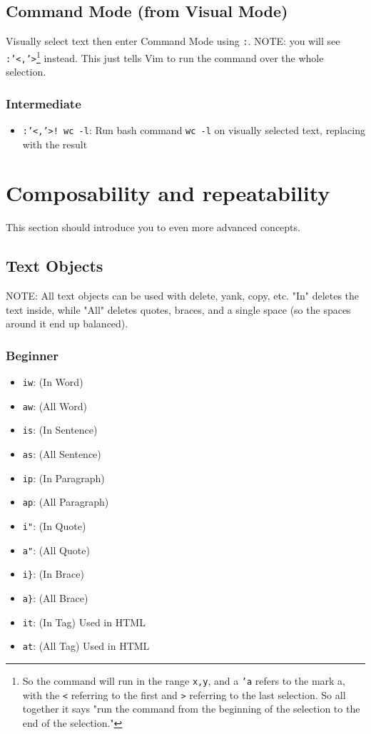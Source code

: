 \documentclass[11pt]{article}
\begin{document}
\subsection{Command Mode (from Visual Mode)}
\label{sec:orgb7e04bd}
Visually select text then enter Command Mode using \texttt{:}. NOTE: you will see
\texttt{:'<,'>}\footnote{So the command will run in the range \texttt{x,y}, and a \texttt{'a} refers to
the mark a, with the \texttt{<} referring to the first and \texttt{>} referring to the
last selection. So all together it says "run the command from the 
beginning of the selection to the end of the selection."} instead. This just tells Vim to run the command over the whole
selection.
\subsubsection{Intermediate}
\label{sec:orge2b03f9}
\begin{itemize}
\item \texttt{:'<,'>! wc -l}: Run bash command \texttt{wc -l} on visually selected text, replacing with the result
\end{itemize}
\section{Composability and repeatability}
\label{sec:org69549f1}
This section should introduce you to even more advanced concepts.
\subsection{Text Objects}
\label{sec:org31314fe}
NOTE: All text objects can be used with delete, yank, copy, etc. "In" deletes
the text inside, while "All" deletes quotes, braces, and a single space (so the
spaces around it end up balanced).
\subsubsection{Beginner}
\label{sec:org3ed771f}
\begin{itemize}
\item \texttt{iw}: (In Word)
\item \texttt{aw}: (All Word)
\item \texttt{is}: (In Sentence)
\item \texttt{as}: (All Sentence)
\item \texttt{ip}: (In Paragraph)
\item \texttt{ap}: (All Paragraph)
\item \texttt{i"}: (In Quote)
\item \texttt{a"}: (All Quote)
\item \texttt{i\}}: (In Brace)
\item \texttt{a\}}: (All Brace)
\item \texttt{it}: (In Tag) Used in HTML
\item \texttt{at}: (All Tag) Used in HTML
\end{itemize}
\end{document}
